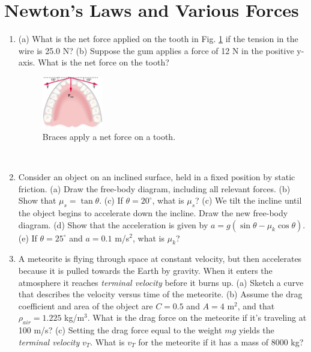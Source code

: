 \documentclass[10pt]{article}
\begin{document}
\section{Newton's Laws and Various Forces}
\begin{enumerate}
\item (a) What is the net force applied on the tooth in Fig. \ref{fig:mouth} if the tension in the wire is 25.0 N?  (b) Suppose the gum applies a force of 12 N in the positive y-axis.  What is the net force on the tooth?
\begin{figure}[hb]
\centering
\includegraphics[width=0.25\textwidth]{figures/mouth.png}
\caption{\label{fig:mouth} Braces apply a net force on a tooth.}
\end{figure} \\
\item Consider an object on an inclined surface, held in a fixed position by static friction. (a) Draw the free-body diagram, including all relevant forces.  (b) Show that $\mu_s = \tan\theta$.  (c) If $\theta=20^{\circ}$, what is $\mu_s$? (c) We tilt the incline until the object begins to accelerate down the incline.  Draw the new free-body diagram. (d) Show that the acceleration is given by $a = g(\sin\theta-\mu_k \cos\theta)$.  (e) If $\theta=25^{\circ}$ and $a=0.1$ m/s$^2$, what is $\mu_k$? \\ \vspace{2.5cm}
\item A meteorite is flying through space at constant velocity, but then accelerates because it is pulled towards the Earth by gravity.  When it enters the atmosphere it reaches \textit{terminal velocity} before it burns up. (a) Sketch a curve that describes the velocity versus time of the meteorite.  (b) Assume the drag coefficient and area of the object are $C=0.5$ and $A=4$ m$^2$, and that $\rho_{air} = 1.225$ kg/m$^3$.  What is the drag force on the meteorite if it's traveling at 100 m/s? (c) Setting the drag force equal to the weight $mg$ yields the \textit{terminal velocity} $v_{T}$.  What is $v_{T}$ for the meteorite if it has a mass of 8000 kg? \\ \vspace{3cm}
\end{enumerate}
\end{document}
